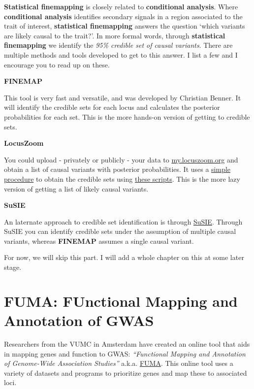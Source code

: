 \documentclass[
]{book}
\begin{document}
\textbf{Statistical finemapping} is closely related to \textbf{conditional analysis}. Where \textbf{conditional analysis} identifies secondary signals in a region associated to the trait of interest, \textbf{statistical finemapping} answers the question `which variants are likely causal to the trait?'. In more formal words, through \textbf{statistical finemapping} we identify the \emph{95\% credible set of causal variants}.
There are multiple methods and tools developed to get to this answer. I list a few and I encourage you to read up on these.

\textbf{FINEMAP}

This tool is very fast and versatile, and was developed by Christian Benner. It will identify the credible sets for each locus and calculates the posterior probabilities for each set. This is the more hands-on version of getting to credible sets.

\textbf{LocusZoom}

You could upload - privately or publicly - your data to \href{https://my.locuszoom.org}{my.locuszoom.org} and obtain a list of causal variants with posterior probabilities. It uses a \href{https://statgen.github.io/gwas-credible-sets/method/locuszoom-credible-sets.pdf}{simple procedure} to obtain the credible sets using \href{https://github.com/statgen/gwas-credible-sets/}{these scripts}. This is the more lazy version of getting a list of likely causal variants.

\textbf{SuSIE}

An laternate approach to credible set identification is through \href{https://stephenslab.github.io/susieR/index.html}{SuSIE}. Through SuSIE you can identify credible sets under the assumption of multiple causal variants, whereas \textbf{FINEMAP} assumes a single causal variant.

For now, we will skip this part. I will add a whole chapter on this at some later stage.

\hypertarget{fuma-functional-mapping-and-annotation-of-gwas}{%
\section{FUMA: FUnctional Mapping and Annotation of GWAS}\label{fuma-functional-mapping-and-annotation-of-gwas}}

Researchers from the VUMC in Amsterdam have created an online tool that aids in mapping genes and function to GWAS: \emph{``Functional Mapping and Annotation of Genome-Wide Association Studies''} a.k.a. \href{https://fuma.ctglab.nl}{FUMA}. This online tool uses a variety of datasets and programs to prioritize genes and map these to associated loci.
\end{document}
